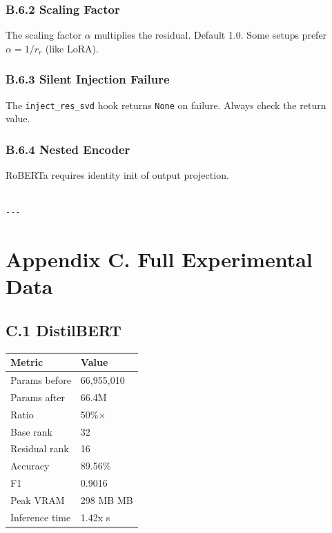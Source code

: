 \subsubsection{B.6.2 Scaling Factor}

The scaling factor $\alpha$ multiplies the residual. Default 1.0. Some 
setups prefer $\alpha = 1/r_r$ (like LoRA).

\subsubsection{B.6.3 Silent Injection Failure}

The \texttt{inject\_res\_svd} hook returns \texttt{None} on failure. Always check the 
return value.

\subsubsection{B.6.4 Nested Encoder}

RoBERTa requires identity init of output projection.
\begin{lstlisting}

---
\end{lstlisting}

\section{Appendix C. Full Experimental Data}

\subsection{C.1 DistilBERT}

\begin{table}[H]
\centering
\small
\begin{tabular}{ll}
\toprule
\textbf{Metric} & \textbf{Value} \\
\midrule
Params before & 66,955,010 \\
Params after & 66.4M \\
Ratio & 50\%$\times$ \\
Base rank & 32 \\
Residual rank & 16 \\
Accuracy & 89.56\% \\
F1 & 0.9016 \\
Peak VRAM & 298 MB MB \\
Inference time & 1.42x s \\
\bottomrule
\end{tabular}
\end{table}

